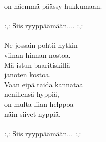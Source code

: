         on näemmä päässy hukkumaan. \\
\hspace{10mm} \\
        :,: Siis ryyppäämään.... :,: \\
\hspace{10mm} \\
        Ne jossain pohtii nytkin \\
        viinan hinnan nostoa. \\
        Mä istun baaritiskillä \\
        janoten kostoa. \\
        Vaan eipä taida kannataa \\
        nenillensä hyppiä, \\
        on multa liian helppoa \\
        näin siivet nyppiä. \\
\hspace{10mm} \\
        :,: Siis ryyppäämään... :,: \\
